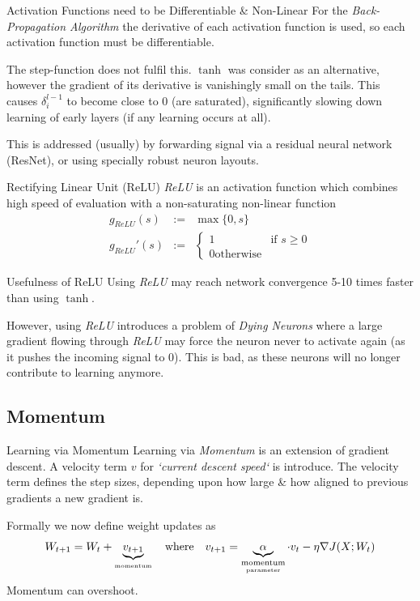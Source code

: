 \documentclass[11pt,a4paper]{article}
\begin{document}
\begin{remark}{Activation Functions need to be Differentiable \& Non-Linear}
  For the \textit{Back-Propagation Algorithm} the derivative of each activation function is used, so each activation function must be differentiable.
  \par The step-function does not fulfil this. $\tanh$ was consider as an alternative, however the gradient of its derivative is vanishingly small on the tails. This causes $\delta_i^{l-1}$ to become close to 0 (are saturated), significantly slowing down learning of early layers (if any learning occurs at all).
  \par This is addressed (usually) by forwarding signal via a residual neural network (ResNet), or using specially robust neuron layouts.
\end{remark}

\begin{definition}{Rectifying Linear Unit (ReLU)}
  \textit{ReLU} is an activation function which combines high speed of evaluation with a non-saturating non-linear function
  \[\begin{array}{rcl}
      g_{ReLU}(s)&:=&\max\{0,s\}\\
      g_{ReLU}'(s)&:=&\begin{cases}1&\text{if }s\geq0\\0\text{otherwise}\end{cases}
  \end{array}\]
\end{definition}

\begin{remark}{Usefulness of ReLU}
  Using \textit{ReLU} may reach network convergence 5-10 times faster than using $\tanh$.
  \par However, using \textit{ReLU} introduces a problem of \textit{Dying Neurons} where a large gradient flowing through \textit{ReLU} may force the neuron never to activate again (as it pushes the incoming signal to 0). This is bad, as these neurons will no longer contribute to learning anymore.
\end{remark}

\subsection{Momentum}

\begin{proposition}{Learning via Momentum}
  Learning via \textit{Momentum} is an extension of gradient descent. A velocity term $v$ for \textit{`current descent speed`} is introduce. The velocity term defines the step sizes, depending upon how large \& how aligned to previous gradients a new gradient is.
  \par Formally we now define weight updates as
  \[ W_{t+1}=W_t+\underbrace{v_{t+1}}_\text{\tiny momentum}\quad\text{where}\quad v_{t+1}=\underbrace{\alpha}_{ \underset{\text{parameter}}{\text{momentum}}}\cdot v_t-\eta\nabla J(X;W_t) \]
  Momentum can overshoot.
\end{proposition}
\end{document}
